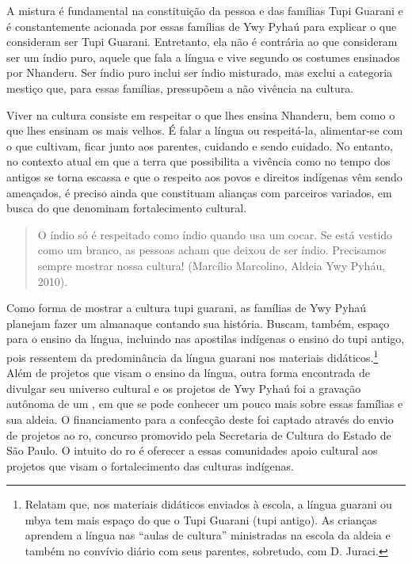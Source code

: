 {{A mistura é fundamental na constituição da pessoa e das famílias Tupi
Guarani e é constantemente acionada por essas famílias de Ywy Pyhaú
para explicar o que consideram ser Tupi Guarani. Entretanto, ela não é
contrária ao que consideram ser um índio puro, aquele que fala a língua
e vive segundo os costumes ensinados por Nhanderu. Ser índio puro
inclui ser índio misturado, mas exclui a categoria mestiço que, para
essas famílias, pressupõem a não vivência na cultura.

Viver na cultura consiste em respeitar o que lhes ensina Nhanderu, bem
como o que lhes ensinam os mais velhos. É falar a língua ou
respeitá-la, alimentar-se com o que cultivam, ficar junto aos parentes,
cuidando e sendo cuidado. No entanto, no contexto atual em que a terra
que possibilita a vivência como no tempo dos antigos se torna escassa e
que o respeito aos povos e direitos indígenas vêm sendo ameaçados, é
preciso ainda que constituam alianças com parceiros variados, em busca
do que denominam fortalecimento cultural.  

\begin{quotation}
O índio só é respeitado como índio quando usa um cocar. Se está vestido
como um branco, as pessoas acham que deixou de ser índio. Precisamos
sempre mostrar nossa cultura! (Marcílio Marcolino, Aldeia Ywy Pyháu,
2010).
\end{quotation}

Como forma de mostrar a cultura tupi guarani, as famílias de Ywy Pyhaú
planejam fazer um almanaque contando sua história. Buscam, também,
espaço para o ensino da língua, incluindo nas apostilas indígenas o
ensino do tupi antigo, pois ressentem da predominância da língua
guarani nos materiais didáticos.\footnote{Relatam que, nos materiais
didáticos enviados à escola, a língua guarani ou mbya tem mais espaço
do que o Tupi Guarani (tupi antigo). As crianças aprendem a língua nas
``aulas de cultura'' ministradas na escola da aldeia e também no convívio
diário com seus parentes, sobretudo, com D. Juraci.} Além de projetos
que visam o ensino da língua, outra forma encontrada de divulgar seu
universo cultural e os projetos de Ywy Pyhaú foi a gravação autônoma de
um , em que se pode conhecer um pouco mais sobre essas famílias e
sua aldeia. O financiamento para a confecção deste  foi captado
através do envio de projetos ao ro, concurso promovido pela
Secretaria de Cultura do Estado de São Paulo. O intuito do ro é
oferecer a essas comunidades apoio cultural aos projetos que visam o
fortalecimento das culturas indígenas. 

}}
